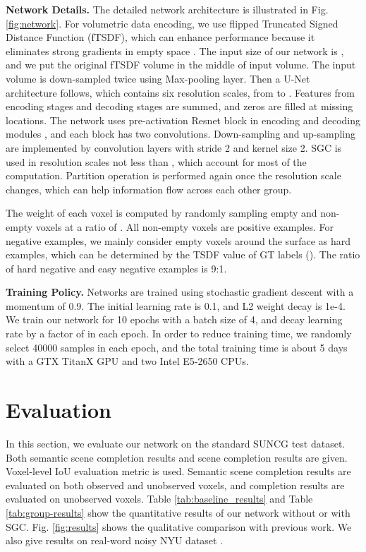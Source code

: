\documentclass[runningheads]{llncs}
\begin{document}
\noindent\textbf{Network Details.} The detailed network architecture is illustrated in Fig. \ref{fig:network}. For volumetric data encoding, we use flipped Truncated Signed Distance Function (fTSDF), which can enhance performance because it eliminates strong gradients in empty space \cite{song2016semantic}. The input size of our network is , and we put the original fTSDF volume in the middle of input volume. The input volume is down-sampled twice using Max-pooling layer. Then a U-Net architecture follows, which contains six resolution scales, from  to . Features from encoding stages and decoding stages are summed, and zeros are filled at missing locations. The network uses pre-activation Resnet block in encoding and decoding modules \cite{he2016deep,he2016identity}, and each block has two  convolutions. Down-sampling and up-sampling are implemented by convolution layers with stride 2 and kernel size 2.
SGC is used in resolution scales not less than , which account for most of the computation.
Partition operation is performed again once the resolution scale changes, which can help information flow across each other group.

The weight of each voxel is computed by randomly sampling empty and non-empty voxels at a ratio of  \cite{song2016semantic}. All non-empty voxels are positive examples. For negative examples, we mainly consider empty voxels around the surface as hard examples, which can be determined by the TSDF value of GT labels (). The ratio of hard negative and easy negative examples is 9:1.

\noindent\textbf{Training Policy.} Networks are trained using stochastic gradient descent with a momentum of 0.9. The initial learning rate is 0.1, and L2 weight decay is 1e-4. We train our network for 10 epochs with a batch size of 4, and decay learning rate by a factor of  in each epoch. In order to reduce training time, we randomly select 40000 samples in each epoch, and the total training time is about 5 days with a GTX TitanX GPU and two Intel E5-2650 CPUs.

\section{Evaluation}
In this section, we evaluate our network on the standard SUNCG test dataset. Both semantic scene completion results and scene completion results are given. Voxel-level IoU evaluation metric is used. Semantic scene completion results are evaluated on both observed and unobserved voxels, and completion results are evaluated on unobserved voxels.
Table \ref{tab:baseline_results} and Table \ref{tab:group-results} show the quantitative results of our network without or with SGC. Fig. \ref{fig:results} shows the qualitative comparison with previous work.
We also give results on real-word noisy NYU dataset \cite{silberman2012indoor}.
\end{document}
